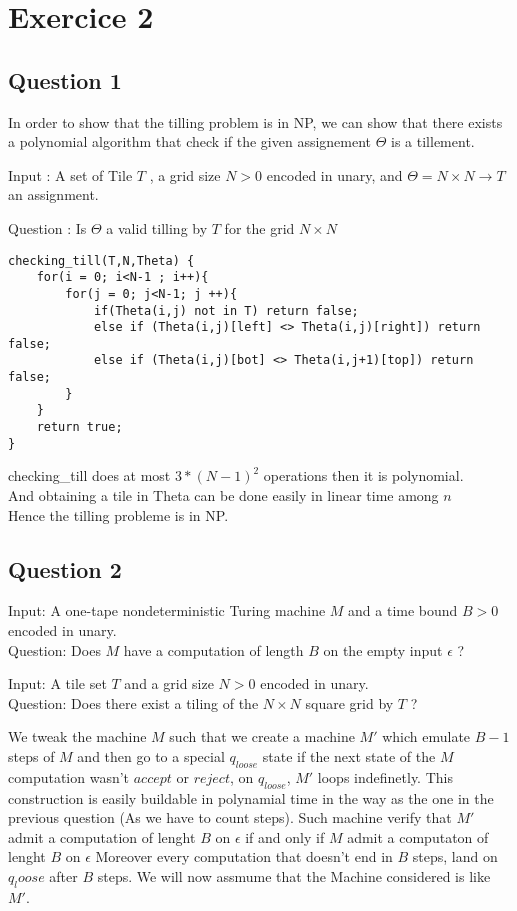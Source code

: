 \section{Exercice 2}
\subsection{Question 1}
In order to show that the tilling problem is in NP, we can show that there exists a polynomial algorithm that check if the given assignement $\Theta$ is a tillement.

Input : A set of Tile $T$ , a grid size $N>0$ encoded in unary, and $\Theta = N \times N \rightarrow T$ an assignment.

Question : Is $\Theta$ a valid tilling by $T$ for the grid $N \times N$

\begin{lstlisting}
checking_till(T,N,Theta) {
	for(i = 0; i<N-1 ; i++){
		for(j = 0; j<N-1; j ++){
			if(Theta(i,j) not in T) return false;
			else if (Theta(i,j)[left] <> Theta(i,j)[right]) return false;
			else if (Theta(i,j)[bot] <> Theta(i,j+1)[top]) return false;
		}
	}
	return true;
}
\end{lstlisting}

checking\_till does at most $3*(N-1)^2$ operations then it is polynomial.
\\And obtaining a tile in Theta can be done easily in linear time among $n$
\\Hence the tilling probleme is in NP.

\subsection{Question 2}

Input: A one-tape nondeterministic Turing machine $M$ and a time bound $B > 0$ encoded in unary.
\\Question: Does $M$ have a computation of length $B$ on the empty input $\epsilon$ ?

Input: A tile set $T$ and a grid size $N > 0$ encoded in unary.
\\Question: Does there exist a tiling of the $N \times N$ square grid by $T$ ?


We tweak the machine $M$ such that we create a machine $M'$ which emulate $B-1$ steps of $M$ and then go to a special $q_{loose}$ state if the next state of the $M$ computation wasn't $accept$ or $reject$, on $q_{loose}$, $M'$ loops indefinetly.
This construction is easily buildable in polynamial time in the way as the one in the previous question (As we have to count steps). 
Such machine verify that $M'$ admit a computation of lenght $B$ on $\epsilon$ if and only if $M$ admit a computaton of lenght $B$ on $\epsilon$
Moreover every computation that doesn't end in $B$ steps, land on $q_loose$ after $B$ steps.
We will now assmume that the Machine considered is like $M'$.

